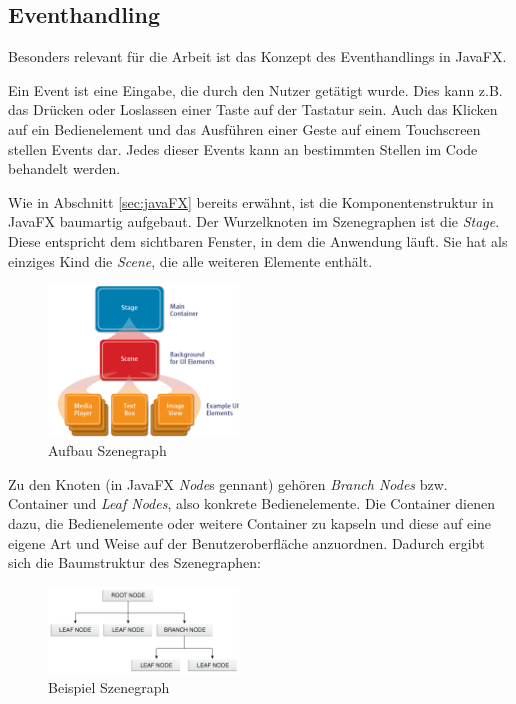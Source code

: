\subsection{Eventhandling} \label{sec:javafxEventhandling}
Besonders relevant für die Arbeit ist das Konzept des Eventhandlings in JavaFX.\par
Ein Event ist eine Eingabe, die durch den Nutzer getätigt wurde. Dies kann z.B. das Drücken oder Loslassen einer Taste auf der Tastatur sein. Auch das Klicken auf ein Bedienelement und das Ausführen einer Geste auf einem Touchscreen stellen Events dar. Jedes dieser Events kann an bestimmten Stellen im Code behandelt werden.\par
Wie in Abschnitt \ref{sec:javaFX} bereits erwähnt, ist die Komponentenstruktur in JavaFX baumartig aufgebaut. Der Wurzelknoten im Szenegraphen ist die \textit{Stage}. Diese entspricht dem sichtbaren Fenster, in dem die Anwendung läuft. Sie hat als einziges Kind die \textit{Scene}, die alle weiteren Elemente enthält.
\begin{figure}[H]
 \centering
 \includegraphics[width=0.45\textwidth]{grafiken/scenegraph.png}
 \caption{Aufbau Szenegraph \cite{Jakob2015}}
 \label{fig:scenegraph}
\end{figure} 
Zu den Knoten (in JavaFX \textit{Node}s gennant) gehören \textit{Branch Nodes} bzw. Container und \textit{Leaf Nodes}, also konkrete Bedienelemente. Die Container dienen dazu, die Bedienelemente oder weitere Container zu kapseln und diese auf eine eigene Art und Weise auf der Benutzeroberfläche anzuordnen. Dadurch ergibt sich die Baumstruktur des Szenegraphen:
\begin{figure}[H]
 \centering
 \includegraphics[width=0.45\textwidth]{grafiken/scenegraph2.png}
 \caption{Beispiel Szenegraph \cite{Hommel2013}}
 \label{fig:scenegraph2}
\end{figure} 
